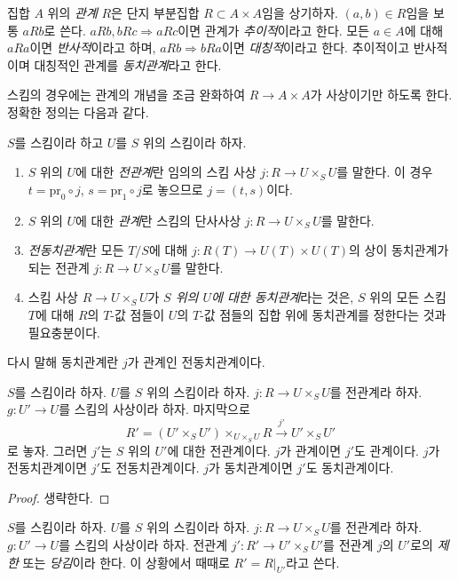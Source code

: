 \noindent
집합 $A$ 위의 {\it 관계} $R$은 단지 부분집합
$R \subset A \times A$임을 상기하자. $(a, b) \in R$임을 보통
$a R b$로 쓴다. $a R b, b R c \Rightarrow a R c$이면 관계가
{\it 추이적}이라고 한다. 모든 $a \in A$에 대해 $a R a$이면
{\it 반사적}이라고 하며, $a R b \Rightarrow b R a$이면
{\it 대칭적}이라고 한다. 추이적이고 반사적이며 대칭적인 관계를
{\it 동치관계}라고 한다.

\medskip\noindent
스킴의 경우에는 관계의 개념을 조금 완화하여
$R \to A \times A$가 사상이기만 하도록 한다. 정확한 정의는 다음과 같다.

\begin{definition}
\label{definition-equivalence-relation}
$S$를 스킴이라 하고 $U$를 $S$ 위의 스킴이라 하자.
\begin{enumerate}
\item $S$ 위의 $U$에 대한 {\it 전관계}란 임의의 스킴 사상
$j : R \to U \times_S U$를 말한다. 이 경우
$t = \text{pr}_0 \circ j$, $s = \text{pr}_1 \circ j$로 놓으므로
$j = (t, s)$이다.
\item $S$ 위의 $U$에 대한 {\it 관계}란 스킴의 단사사상
$j : R \to U \times_S U$를 말한다.
\item {\it 전동치관계}란 모든 $T/S$에 대해
$j : R(T) \to U(T) \times U(T)$의 상이 동치관계가 되는 전관계
$j : R \to U \times_S U$를 말한다.
\item 스킴 사상 $R \to U \times_S U$가
{\it $S$ 위의 $U$에 대한 동치관계}라는 것은, $S$ 위의 모든 스킴
$T$에 대해 $R$의 $T$-값 점들이 $U$의 $T$-값 점들의 집합 위에
동치관계를 정한다는 것과 필요충분이다.
\end{enumerate}
\end{definition}

\noindent
다시 말해 동치관계란 $j$가 관계인 전동치관계이다.

\begin{lemma}
\label{lemma-restrict-relation}
$S$를 스킴이라 하자.
$U$를 $S$ 위의 스킴이라 하자.
$j : R \to U \times_S U$를 전관계라 하자.
$g : U' \to U$를 스킴의 사상이라 하자. 마지막으로
$$
R' = (U' \times_S U')\times_{U \times_S U} R
\xrightarrow{j'}
U' \times_S U'
$$
로 놓자. 그러면 $j'$는 $S$ 위의 $U'$에 대한 전관계이다.
$j$가 관계이면 $j'$도 관계이다.
$j$가 전동치관계이면 $j'$도 전동치관계이다.
$j$가 동치관계이면 $j'$도 동치관계이다.
\end{lemma}

\begin{proof}
생략한다.
\end{proof}

\begin{definition}
\label{definition-restrict-relation}
$S$를 스킴이라 하자.
$U$를 $S$ 위의 스킴이라 하자.
$j : R \to U \times_S U$를 전관계라 하자.
$g : U' \to U$를 스킴의 사상이라 하자.
전관계 $j' : R' \to U' \times_S U'$를 전관계 $j$의 $U'$로의
{\it 제한} 또는 {\it 당김}이라 한다. 이 상황에서 때때로
$R' = R|_{U'}$라고 쓴다.
\end{definition}

